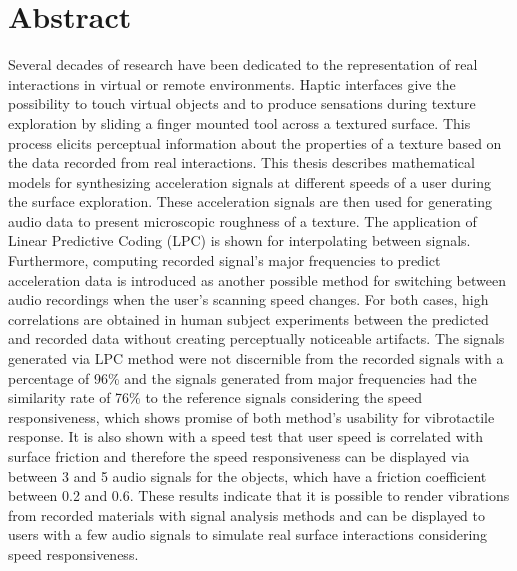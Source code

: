 
\thispagestyle{plain}

\section*{Abstract}


\switchlanguage{\lang} %
Several decades of research have been dedicated to the representation of real interactions in virtual or remote environments. Haptic interfaces give the possibility to touch virtual objects and to produce sensations during texture exploration by sliding a finger mounted tool across a textured surface. This process elicits perceptual information about the properties of a texture based on the data recorded from real interactions. This thesis describes mathematical models for synthesizing acceleration signals at different speeds of a user during the surface exploration. These acceleration signals are then used for generating audio data to present microscopic roughness of a texture. The application of Linear Predictive Coding (LPC) is shown for interpolating between signals. Furthermore, computing recorded signal's major frequencies to predict acceleration data is introduced as another possible method for switching between audio recordings when the user's scanning speed changes. For both cases, high correlations are obtained in human subject experiments between the predicted and recorded data without creating perceptually noticeable artifacts.  The signals generated via LPC method were not discernible from the recorded signals with a percentage of 96\% and the signals generated from major frequencies had the similarity rate of 76\% to the reference signals considering the speed responsiveness, which shows promise of both method's usability for vibrotactile response. It is also shown with a speed test that user speed is correlated with surface friction and therefore the speed responsiveness can be displayed via between 3 and 5 audio signals for the objects, which have a friction coefficient between 0.2 and 0.6. These results indicate that it is possible to render vibrations from recorded materials with signal analysis methods and can be displayed to users with a few audio signals to simulate real surface interactions considering speed responsiveness.






